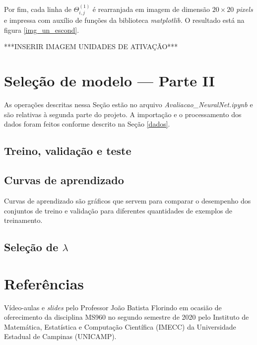 \documentclass[12pt]{article}
\begin{document}
Por fim, cada linha de $\Theta^{(1)}_{i,j}$ é rearranjada em imagem de dimensão $20 \times 20$ \textit{pixels} e impressa com auxílio de funções da biblioteca \textit{matplotlib.} O resultado está na figura \ref{img_un_escond}.

***INSERIR IMAGEM UNIDADES DE ATIVAÇÃO*** 

\section{Seleção de modelo --- Parte II} \label{parte2}
As operações descritas nessa Seção estão no arquivo \textit{Avaliacao\_NeuralNet.ipynb} e são relativas à segunda parte do projeto. A importação e o processamento dos dados foram feitos conforme descrito na Seção \ref{dados}.


\subsection{Treino, validação e teste}

\subsection{Curvas de aprendizado}
Curvas de aprendizado são gráficos que servem para comparar o desempenho dos conjuntos de treino e validação para diferentes quantidades de exemplos de treinamento. 

\subsection{Seleção de $\lambda$}


\section{Referências}
Vídeo-aulas e \textit{slides} pelo Professor João Batista Florindo em ocasião de oferecimento da disciplina MS960 no segundo semestre de 2020 pelo Instituto de Matemática, Estatística e Computação Científica (IMECC) da Universidade Estadual de Campinas (UNICAMP).
\end{document}
